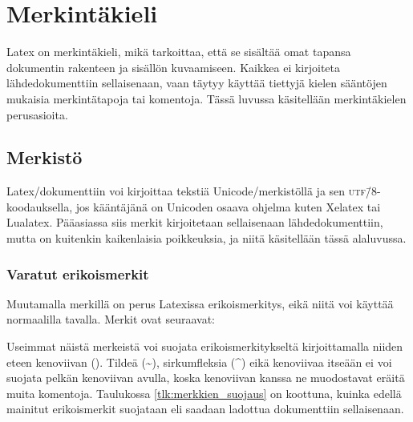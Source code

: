 \chapter{Merkintäkieli}

Latex on merkintäkieli, mikä tarkoittaa, että se sisältää omat tapansa
dokumentin rakenteen ja sisällön kuvaamiseen. Kaikkea ei kirjoiteta
lähdedokumenttiin sellaisenaan, vaan täytyy käyttää tiettyjä kielen
sääntöjen mukaisia merkintätapoja tai komentoja. Tässä luvussa
käsitellään merkintäkielen perus\-asioita.

\section{Merkistö}

Latex\-/dokumenttiin voi kirjoittaa tekstiä Unicode\-/merkistöllä ja sen
\textsc{utf}\=/8\/-koodauksella, jos kääntäjänä on Unicoden osaava
ohjelma kuten Xelatex tai Lualatex. Pääasiassa siis merkit kirjoitetaan
sellaisenaan lähdedokumenttiin, mutta on kuitenkin kaikenlaisia
poikkeuksia, ja niitä käsitellään tässä alaluvussa.

\subsection{Varatut erikoismerkit}

Muutamalla merkillä on perus Latexissa erikoismerkitys, eikä niitä voi
käyttää normaalilla tavalla. Merkit ovat seuraavat:

\begin{koodilohkosis}
\end{koodilohkosis}

Useimmat näistä merkeistä voi suojata erikoismerkitykseltä
kirjoittamalla niiden eteen kenoviivan (\koodi{\keno}). Tildeä
(\textasciitilde), sirkumfleksia (\textasciicircum) eikä kenoviivaa
itseään ei voi suojata pelkän kenoviivan avulla, koska kenoviivan kanssa
ne muodostavat eräitä muita komentoja. Taulukossa
\ref{tlk:merkkien_suojaus} on koottuna, kuinka edellä mainitut
erikoismerkit suojataan eli saadaan ladottua dokumenttiin sellaisenaan.

